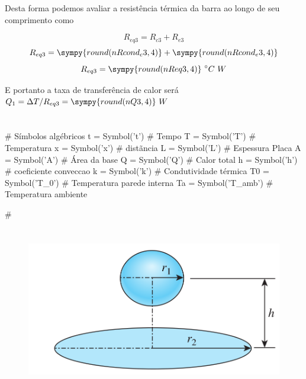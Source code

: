 \documentclass[a4paper,11pt]{article}
\newcommand{\npy}[1]{\sympy{round(n#1,4)}}
\begin{document}
Desta forma podemos avaliar a resistência térmica da barra ao longo de seu comprimento como

$$R_{eq3} = R_{c3} + R_{e3}$$
$$R_{eq3} = \npy{Rcond_c3} + \npy{Rcond_e3}$$
$$R_{eq3} = \npy{Req3}\ ^\circ C\ W$$

E portanto a taxa de transferência de calor será $Q_1 = \Delta T/R_{eq3} = \npy{Q3}\ W$


\section{} %
\begin{sympycode}
# Símbolos algébricos
t = Symbol('t') # Tempo
T = Symbol('T') # Temperatura
x = Symbol('x') # distãncia
L = Symbol('L') # Espessura Placa
A = Symbol('A') # Área da base
Q = Symbol('Q') # Calor total
h = Symbol('h') # coeficiente conveccao
k = Symbol('k') # Condutividade térmica
T0 = Symbol('T_0') # Temperatura parede interna
Ta = Symbol('T_amb') # Temperatura ambiente

#

\end{sympycode}


\section{} %

\begin{figure}[H]
\centering
\includegraphics[width = 0.6\linewidth]{./image/lista1/q15}
\end{figure}

\end{document}

